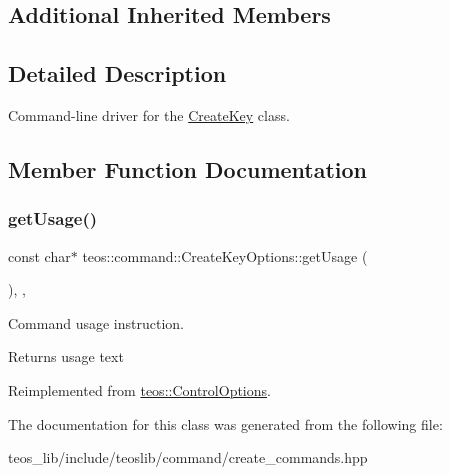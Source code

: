 \subsection*{Additional Inherited Members}


\subsection{Detailed Description}
Command-\/line driver for the \mbox{\hyperlink{classteos_1_1command_1_1_create_key}{Create\+Key}} class. 

\subsection{Member Function Documentation}
\mbox{\label{classteos_1_1command_1_1_create_key_options_ac4c7176d534ed832ebfc954e36238a4c}} 
\subsubsection{\texorpdfstring{get\+Usage()}{getUsage()}}
{\footnotesize\ttfamily const char$\ast$ teos\+::command\+::\+Create\+Key\+Options\+::get\+Usage (\begin{DoxyParamCaption}{ }\end{DoxyParamCaption})\hspace{0.3cm}{\ttfamily [inline]}, {\ttfamily [protected]}, {\ttfamily [virtual]}}



Command \textquotesingle{}usage\textquotesingle{} instruction. 

\begin{DoxyReturn}{Returns}
usage text 
\end{DoxyReturn}


Reimplemented from \mbox{\hyperlink{classteos_1_1_control_options_a0aa5671f9bc750ed5280c26c543874f3}{teos\+::\+Control\+Options}}.



The documentation for this class was generated from the following file\+:\begin{DoxyCompactItemize}
\item 
teos\+\_\+lib/include/teoslib/command/create\+\_\+commands.\+hpp\end{DoxyCompactItemize}
